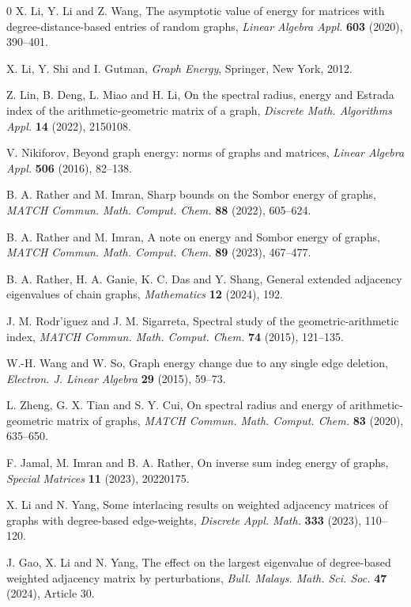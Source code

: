 \documentclass[12pt,twoside]{article}
\begin{document}
\begin{thebibliography}{0}
	X. Li, Y. Li and Z. Wang,
	The asymptotic value of energy for matrices with degree-distance-based entries of random graphs,
	\emph{Linear Algebra Appl.} \textbf{603} (2020), 390--401.
	
	X. Li, Y. Shi and I. Gutman,
	\emph{Graph Energy},
	Springer, New York, 2012.
	
	Z. Lin, B. Deng, L. Miao and H. Li,
	On the spectral radius, energy and Estrada index of the arithmetic-geometric matrix of a graph,
	\emph{Discrete Math. Algorithms Appl.} \textbf{14} (2022), 2150108.
	
	V. Nikiforov,
	Beyond graph energy: norms of graphs and matrices,
	\emph{Linear Algebra Appl.} \textbf{506} (2016), 82--138.
	
	B. A. Rather and M. Imran,
	Sharp bounds on the Sombor energy of graphs,
	\emph{MATCH Commun. Math. Comput. Chem.} \textbf{88} (2022), 605--624.
	
	B. A. Rather and M. Imran,
	A note on energy and Sombor energy of graphs,
	\emph{MATCH Commun. Math. Comput. Chem.} \textbf{89} (2023), 467--477.
	
	B. A. Rather, H. A. Ganie, K. C. Das and Y. Shang,
	General extended adjacency eigenvalues of chain graphs,
	\emph{Mathematics} \textbf{12} (2024), 192.
	
	J. M. Rodr'iguez and J. M. Sigarreta,
	Spectral study of the geometric-arithmetic index,
	\emph{MATCH Commun. Math. Comput. Chem.} \textbf{74} (2015), 121--135.
	
	W.-H. Wang and W. So,
	Graph energy change due to any single edge deletion,
	\emph{Electron. J. Linear Algebra} \textbf{29} (2015), 59--73.
	
	L. Zheng, G. X. Tian and S. Y. Cui,
	On spectral radius and energy of arithmetic-geometric matrix of graphs,
	\emph{MATCH Commun. Math. Comput. Chem.} \textbf{83} (2020), 635--650.
	
	F. Jamal, M. Imran and B. A. Rather,
	On inverse sum indeg energy of graphs,
	\emph{Special Matrices} \textbf{11} (2023), 20220175.
	
	X. Li and N. Yang,
	Some interlacing results on weighted adjacency matrices of graphs with degree-based edge-weights,
	\emph{Discrete Appl. Math.} \textbf{333} (2023), 110--120.
	
	J. Gao, X. Li and N. Yang,
	The effect on the largest eigenvalue of degree-based weighted adjacency matrix by perturbations,
	\emph{Bull. Malays. Math. Sci. Soc.} \textbf{47} (2024), Article 30.
	

\end{thebibliography}
\end{document}
